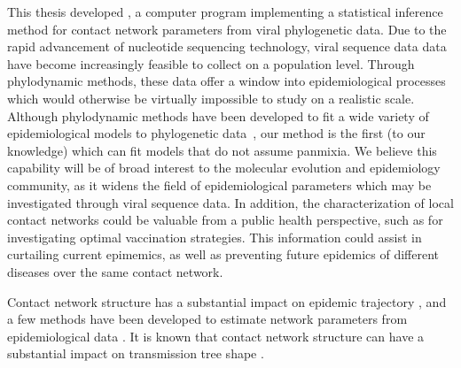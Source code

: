 This thesis developed , a computer program implementing a
statistical inference method for contact network parameters from viral
phylogenetic data. Due to the rapid advancement of nucleotide sequencing
technology, viral sequence data data have become increasingly feasible to
collect on a population level. Through phylodynamic methods, these data offer a
window into epidemiological processes which would otherwise be virtually
impossible to study on a realistic scale. Although phylodynamic methods have
been developed to fit a wide variety of epidemiological models to phylogenetic
data~\autocite{volz2012complex, rasmussen2014phylodynamic}, our method is the
first (to our knowledge) which can fit models that do not assume panmixia. We
believe this capability will be of broad interest to the molecular evolution
and epidemiology community, as it widens the field of epidemiological
parameters which may be investigated through viral sequence data. In addition,
the characterization of local contact networks could be valuable from a public
health perspective, such as for investigating optimal vaccination strategies.
This information could assist in curtailing current epimemics, as well as
preventing future epidemics of different diseases over the same contact
network.

Contact network structure has a substantial impact on epidemic trajectory
\autocite{barthelemy2005dynamical, volz2007susceptible, volz2008sir}, and a few
methods have been developed to estimate network parameters from epidemiological
data \autocite{volz2007susceptible, britton2002bayesian,
groendyke2011bayesian}. It is known that contact network structure can have a
substantial impact on transmission tree shape \autocite{o2010contact,
robinson2013dynamics, leventhal2012inferring, colijn2014phylogenetic,
villandre2016assessment}.
